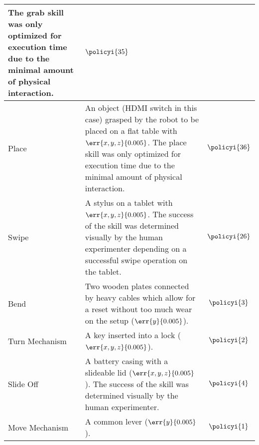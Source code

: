 \begin{table*}[!ht]
{\begin{tabular}{|p{1.5cm}|p{13cm}|c|}
The grab skill was only optimized for execution time due to the minimal amount of physical interaction.& $\policyi{35}$
\\
\hline
Place & An object (HDMI switch in this case) grasped by the robot to be placed on a flat table  with $\err{x,y,z}{0.005}$.
The place skill was only optimized for execution time due to the minimal amount of physical interaction.& $\policyi{36}$
\\
\hline
Swipe & A stylus on a tablet with $\err{x,y,z}{0.005}$.
The success of the skill was determined visually by the human experimenter depending on a successful swipe operation on the tablet.& $\policyi{26}$
\\
\hline
Bend & Two wooden plates connected by heavy cables which allow for a reset without too much wear on the setup ($\err{y}{0.005}$).& $\policyi{3}$
\\
\hline
Turn Mechanism & A key inserted into a lock ($\err{x,y,z}{0.005}$).& $\policyi{2}$
\\
\hline
Slide Off & A battery casing with a slideable lid ($\err{x,y,z}{0.005}$).
The success of the skill was determined visually by the human experimenter.& $\policyi{4}$
\\
\hline
Move Mechanism & A common lever ($\err{y}{0.005}$).& $\policyi{1}$
\\
\hline
\end{tabular}
}
\end{table*}

